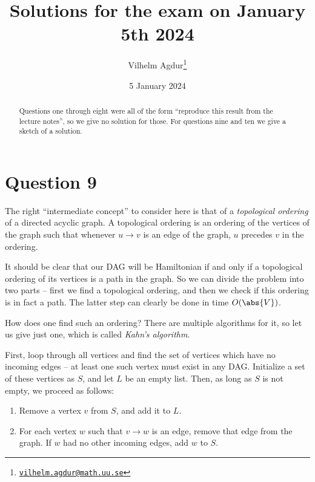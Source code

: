 \documentclass[nobib]{tufte-handout}
\title{Solutions for the exam on January 5th 2024}
\author[Vilhelm Agdur]{Vilhelm Agdur\thanks{\href{mailto:vilhelm.agdur@math.uu.se}{\nolinkurl{vilhelm.agdur@math.uu.se}}}}
\date{5 January 2024}
\begin{document}
\maketitle%

\begin{abstract}
\noindent
Questions one through eight were all of the form ``reproduce this result from the lecture notes'', so we give no solution for those. For questions nine and ten we give a sketch of a solution.
\end{abstract}

\section{Question 9}

The right ``intermediate concept'' to consider here is that of a \emph{topological ordering} of a directed acyclic graph. A topological ordering is an ordering of the vertices of the graph such that whenever $u \to v$ is an edge of the graph, $u$ precedes $v$ in the ordering.

It should be clear that our DAG will be Hamiltonian if and only if a topological ordering of its vertices is a path in the graph. So we can divide the problem into two parts -- first we find a topological ordering, and then we check if this ordering is in fact a path. The latter step can clearly be done in time $O(\abs{V})$.

How does one find such an ordering? There are multiple algorithms for it, so let us give just one, which is called \emph{Kahn's algorithm}.

First, loop through all vertices and find the set of vertices which have no incoming edges -- at least one such vertex must exist in any DAG. Initialize a set of these vertices as $S$, and let $L$ be an empty list. Then, as long as $S$ is not empty, we proceed as follows:
\begin{enumerate}
  \item Remove a vertex $v$ from $S$, and add it to $L$.
  \item For each vertex $w$ such that $v \to w$ is an edge, remove that edge from the graph. If $w$ had no other incoming edges, add $w$ to $S$.
\end{enumerate}
\end{document}
